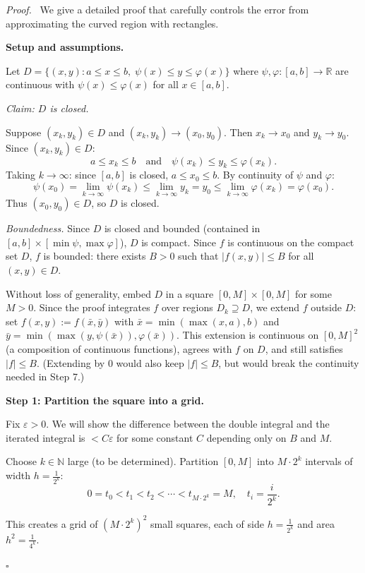 \documentclass[11pt]{report}
\renewenvironment{proof}[1][Proof]{\par\noindent\textit{#1.}\ }{\hfill$\square$\par\medskip}
\newcommand{\R}{\mathbb{R}}
\newcommand{\N}{\mathbb{N}}
\begin{document}
\begin{proof}
We give a detailed proof that carefully controls the error from approximating the curved region with rectangles.

\textbf{Setup and assumptions.}

Let $D = \{(x, y) : a \leq x \leq b, \; \psi(x) \leq y \leq \varphi(x)\}$ where $\psi, \varphi: [a,b] \to \R$ are continuous with $\psi(x) \leq \varphi(x)$ for all $x \in [a, b]$.

\textit{Claim: $D$ is closed.} 

Suppose $(x_k, y_k) \in D$ and $(x_k, y_k) \to (x_0, y_0)$. Then $x_k \to x_0$ and $y_k \to y_0$. Since $(x_k, y_k) \in D$:
\[
a \leq x_k \leq b \quad \text{and} \quad \psi(x_k) \leq y_k \leq \varphi(x_k).
\]
Taking $k \to \infty$: since $[a,b]$ is closed, $a \leq x_0 \leq b$. By continuity of $\psi$ and $\varphi$:
\[
\psi(x_0) = \lim_{k \to \infty} \psi(x_k) \leq \lim_{k \to \infty} y_k = y_0 \leq \lim_{k \to \infty} \varphi(x_k) = \varphi(x_0).
\]
Thus $(x_0, y_0) \in D$, so $D$ is closed.

\textit{Boundedness.} Since $D$ is closed and bounded (contained in $[a, b] \times [\min \psi, \max \varphi]$), $D$ is compact. Since $f$ is continuous on the compact set $D$, $f$ is bounded: there exists $B > 0$ such that $|f(x, y)| \leq B$ for all $(x, y) \in D$.

Without loss of generality, embed $D$ in a square $[0, M] \times [0, M]$ for some $M > 0$. Since the proof integrates $f$ over regions $D_k \supseteq D$, we extend $f$ outside $D$: set $f(x, y) := f(\bar{x}, \bar{y})$ with $\bar{x} = \min(\max(x, a), b)$ and $\bar{y} = \min(\max(y, \psi(\bar{x})), \varphi(\bar{x}))$. This extension is continuous on $[0, M]^2$ (a composition of continuous functions), agrees with $f$ on $D$, and still satisfies $|f| \leq B$. (Extending by $0$ would also keep $|f| \leq B$, but would break the continuity needed in Step 7.)

\textbf{Step 1: Partition the square into a grid.}

Fix $\varepsilon > 0$. We will show the difference between the double integral and the iterated integral is $< C\varepsilon$ for some constant $C$ depending only on $B$ and $M$.

Choose $k \in \N$ large (to be determined). Partition $[0, M]$ into $M \cdot 2^k$ intervals of width $h = \frac{1}{2^k}$:
\[
0 = t_0 < t_1 < t_2 < \cdots < t_{M \cdot 2^k} = M, \quad t_i = \frac{i}{2^k}.
\]

This creates a grid of $(M \cdot 2^k)^2$ small squares, each of side $h = \frac{1}{2^k}$ and area $h^2 = \frac{1}{4^k}$.


\end{proof}
\end{document}
